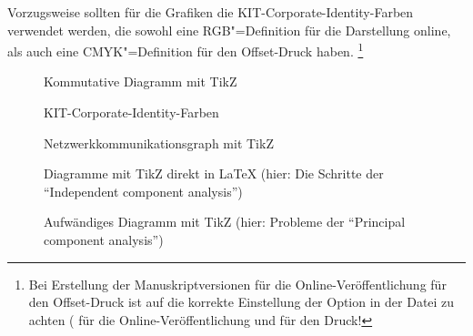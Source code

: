 Vorzugsweise sollten für die Grafiken die KIT-Corporate-Identity-Farben verwendet werden,
die sowohl eine RGB"=Definition für die Darstellung online,
als auch eine CMYK"=Definition für den Offset-Druck haben.%
\footnote{Bei Erstellung der Manuskriptversionen
für die Online-Veröffentlichung \bzw für den Offset-Druck
ist auf die korrekte Einstellung der Option 
in der Datei  zu achten
( für die Online-Veröffentlichung und  für den Druck!}

\begin{figure}[H]%
	\centering%
	\caption{Kommutative Diagramm mit TikZ}%
  \label{fig:kpca}%
\end{figure}

\begin{figure}[H]%
	\centering%
	\caption{KIT-Corporate-Identity-Farben}%
  \label{fig:kit-colors}%
\end{figure}

\begin{figure}[H]%
	\centering%
	\resizebox{0.75\textwidth}{!}{%
	}%
	\caption{Netzwerkkommunikationsgraph mit TikZ}%
  \label{fig:net-comm}%
\end{figure}

\begin{figure}[H]%
	\centering%
	\hfill%
	\hfill%
\caption{Diagramme mit TikZ direkt in LaTeX (hier: Die Schritte der \enquote{Independent component analysis})}%
\label{fig:ica}%
\end{figure}

\begin{figure}[H]
	\centering%
	\hfill%
	\caption{Aufwändiges Diagramm mit TikZ (hier: Probleme der \enquote{Principal component analysis})}%
	\label{fig:pca}%
\end{figure}